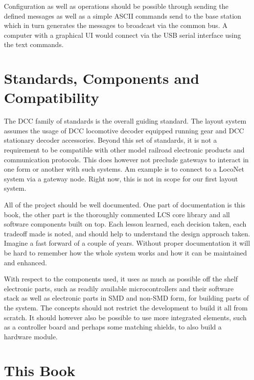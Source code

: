 Configuration as well as operations should be possible through sending the defined messages as well as a simple ASCII commands send to the base station which in turn generates the messages to broadcast via the common bus. A computer with a graphical UI would connect via the USB serial interface using the text commands.

\section*{Standards, Components and Compatibility}

The DCC family of standards is the overall guiding standard. The layout system assumes the usage of DCC locomotive decoder equipped running gear and DCC stationary decoder accessories. Beyond this set of standards, it is not a requirement to be compatible with other model railroad electronic products and communication protocols. This does however not preclude gateways to interact in one form or another with such systems. Am example is to connect to a LocoNet system via a gateway node. Right now, this is not in scope for our first layout system.

All of the project should be well documented. One part of documentation is this book, the other part is the thoroughly commented LCS core library and all software components built on top. Each lesson learned, each decision taken, each tradeoff made is noted, and should help to understand the design approach taken. Imagine a fast forward of a couple of years. Without proper documentation it will be hard to remember how the whole system works and how it can be maintained and enhanced.

With respect to the components used, it uses as much as possible off the shelf electronic parts, such as readily available microcontrollers and their software stack as well as electronic parts in SMD and non-SMD form, for building parts of the system. The concepts should not restrict the development to build it all from scratch. It should however also be possible to use more integrated elements, such as a controller board and perhaps some matching shields, to also build a hardware module.

\section*{This Book}

